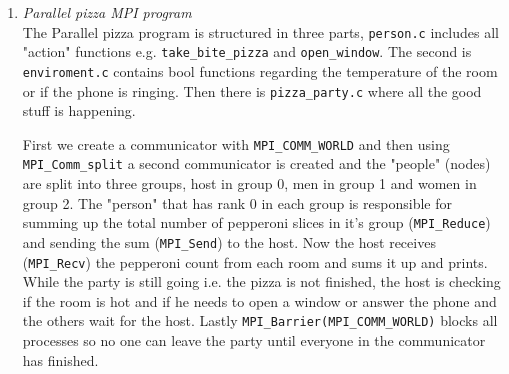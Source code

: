 \documentclass[fontsize=14pt,a4paper]{scrartcl}
\begin{document}
\begin{enumerate}
\begin{enumerate}[label*=\arabic*.]
    \item
    \textit{Parallel pizza MPI program}\\
    The Parallel pizza program is structured in three parts, \texttt{person.c} includes all "action" functions e.g. \texttt{take\_bite\_pizza} and \texttt{open\_window}. The second is \texttt{enviroment.c} contains bool functions regarding the temperature of the room or if the phone is ringing. Then there is \texttt{pizza\_party.c} where all the good stuff is happening. 
    
First we create a communicator with \texttt{MPI\_COMM\_WORLD} and then using \texttt{MPI\_Comm\_split} a second communicator is created and the "people" (nodes) are split into three groups, host in group 0, men in group 1 and women in group 2. The "person" that has rank 0 in each group is responsible for summing up the total number of pepperoni slices in it's group (\texttt{MPI\_Reduce}) and sending the sum (\texttt{MPI\_Send}) to the host. Now the host receives (\texttt{MPI\_Recv}) the pepperoni count from each room and sums it up and prints. While the party is still going i.e. the pizza is not finished, the host is checking if the room is hot and if he needs to open a window or answer the phone and the others wait for the host. Lastly \texttt{MPI\_Barrier(MPI\_COMM\_WORLD)} blocks all processes so no one can leave the party until everyone in the communicator has finished. 

    \end{enumerate}
\end{enumerate}
\end{document}
